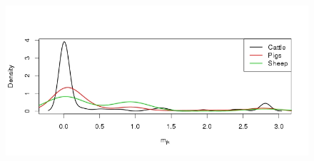 \documentclass[10pt]{article}
\begin{document}
\begin{figure}[!ht]
\begin{center}
\end{center}
\caption{}
\label{fig:migration}
\end{figure}
\newpage
\setcounter{figure}{0}
\begin{figure}[!ht]
\begin{center}
\includegraphics[scale=.5]{FIGURES/trade_info.jpeg}
\end{center}
\caption{}
\label{sfig:tradeinfo}
\end{figure}
\newpage
\end{document}

